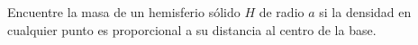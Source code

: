 \item Encuentre la masa de un hemisferio sólido $H$ de radio $a$ si la densidad en cualquier punto es proporcional a su distancia al centro de la base.
